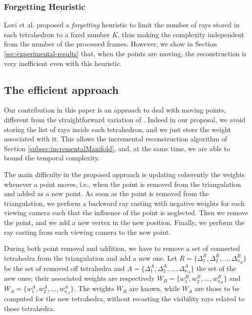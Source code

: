 \subsubsection{Forgetting Heuristic}
Lovi et al. \cite{Lovi_et_al_11} proposed a \emph{forgetting} heuristic to limit the number of rays stored in each tetrahedron to a fixed number $K$, thus making the complexity independent from the number of the processed frames. 
However, we show in Section \ref{sec:experimental-results} that, when the points are moving,  the reconstruction is very inefficient even with this heuristic.

\subsection{The efficient approach}
\label{subsec:efficient_way}
Our contribution in this paper is an approach to deal with moving points, different from the straightforward variation of \cite{Lovi_et_al_11}. Indeed in our proposal, we avoid storing the list of rays inside each tetrahedron, and we just store the weight associated with it.
This allows the incremental reconstruction algorithm of Section \ref{subsec:incrementalManifold}, and, at the same time, we are able to bound the temporal complexity.

The main difficulty in the proposed approach is updating coherently the weights whenever a point moves, i.e., when the point is removed from the triangulation and added as a new point. As soon as the point is removed from the triangulation, we perform a backward ray casting with negative weights for each viewing camera such that the influence of the point is neglected. Then we remove the point, and we add a new vertex in the new position. Finally, we perform the ray casting from each viewing camera to the new point.

During both point removal and addition, we have to remove a set of connected tetrahedra from the triangulation and add a new one. 
Let $R = \{\Delta_1^R, \Delta_2^R, \dots, \Delta_{n_R}^R\}$ be the set of removed off tetrahedra and $A = \{\Delta_1^A, \Delta_2^A, \dots, \Delta_{n_A}^A\}$ the set of the new ones; their associated weights are respectively $W_R = \{w_1^R, w_2^R, \dots, w_{n_R}^R\}$ and $W_A = \{w_1^A, w_2^A, \dots, w_{n_A}^A\}$. The weights $W_R$ are known, while $W_A$ are those to be computed for the new tetrahedra, without recasting the visibility rays related to those tetrahedra.

